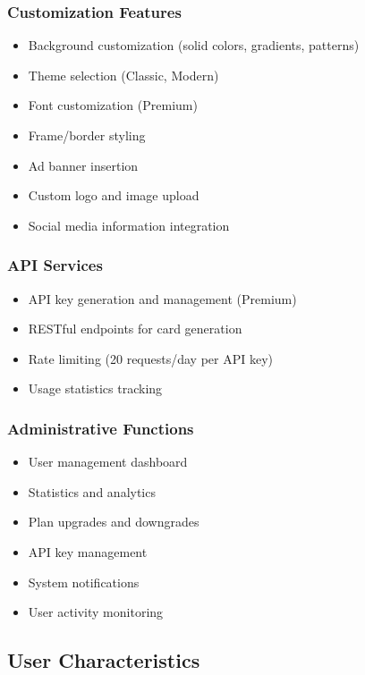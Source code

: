 \documentclass[12pt,a4paper]{article}
\begin{document}
\subsubsection{Customization Features}
\begin{itemize}
    \item Background customization (solid colors, gradients, patterns)
    \item Theme selection (Classic, Modern)
    \item Font customization (Premium)
    \item Frame/border styling
    \item Ad banner insertion
    \item Custom logo and image upload
    \item Social media information integration
\end{itemize}

\subsubsection{API Services}
\begin{itemize}
    \item API key generation and management (Premium)
    \item RESTful endpoints for card generation
    \item Rate limiting (20 requests/day per API key)
    \item Usage statistics tracking
\end{itemize}

\subsubsection{Administrative Functions}
\begin{itemize}
    \item User management dashboard
    \item Statistics and analytics
    \item Plan upgrades and downgrades
    \item API key management
    \item System notifications
    \item User activity monitoring
\end{itemize}

\subsection{User Characteristics}
\end{document}
